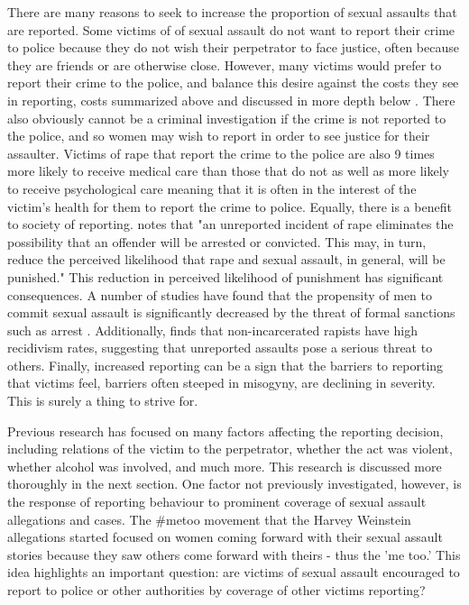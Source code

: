 \documentclass[AER,draftmode]{AEA}
\begin{document}
There are many reasons to seek to increase the proportion of sexual assaults that are reported. Some victims of of sexual assault do not want to report their crime to police because they do not wish their perpetrator to face justice, often because they are friends or are otherwise close. However, many victims would prefer to report their crime to the police, and balance this desire against the costs they see in reporting, costs summarized above and discussed in more depth below \cite{du_mont_role_2003}. There also obviously cannot be a criminal investigation if the crime is not reported to the police, and so women may wish to report in order to see justice for their assaulter. Victims of rape that report the crime to the police are also 9 times more likely to receive medical care than those that do not \cite{resnick_predictors_2000} as well as more likely to receive psychological care \cite{sable_barriers_2006} meaning that it is often in the interest of the victim's health for them to report the crime to police. Equally, there is a benefit to society of reporting.  notes that "an unreported incident of rape eliminates the possibility that an offender will be arrested or convicted. This may, in turn, reduce the perceived likelihood that rape and sexual assault, in general, will be punished." This reduction in perceived likelihood of punishment has significant consequences. A number of studies have found that the propensity of men to commit sexual assault is significantly decreased by the threat of formal sanctions such as arrest \cite{bachman_rationality_1992, antunes_impact_1974}. Additionally,  finds that non-incarcerated rapists have high recidivism rates, suggesting that unreported assaults pose a serious threat to others. Finally, increased reporting can be a sign that the barriers to reporting that victims feel, barriers often steeped in misogyny, are declining in severity. This is surely a thing to strive for.

Previous research has focused on many factors affecting the reporting decision, including relations of the victim to the perpetrator, whether the act was violent, whether alcohol was involved, and much more. This research is discussed more thoroughly in the next section. One factor not previously investigated, however, is the response of reporting behaviour to prominent coverage of sexual assault allegations and cases. The \#metoo movement that the Harvey Weinstein allegations started focused on women coming forward with their sexual assault stories because they saw others come forward with theirs - thus the 'me too.' This idea highlights an important question: are victims of sexual assault encouraged to report to police or other authorities by coverage of other victims reporting?
\end{document}
